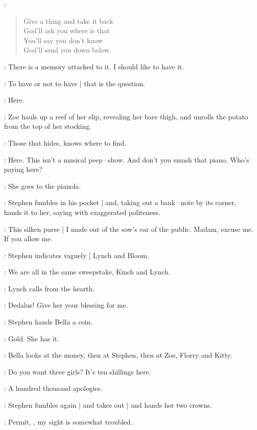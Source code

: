\Zoe:
\begin{verse}
    Give a thing and take it back\\
    God'll ask you where is that\\
    You'll say you don't know\\
    God'll send you down below.
\end{verse}

\Bloom:
There is a memory attached to it.
%
I should like to have it.

\Stephen[4a]:
To have or not to have |
that is the question.

\Zoe:
Here.

:
Zoe hauls up a reef of her slip,
revealing her bare thigh,
and unrolls the potato from the top of her stocking.

\Zoe:
Those that hides,
knows where to find.

\Bella:
Here.
This isn't a musical peep·show.
And don't you smash that piano.
Who's paying here?

:
She goes to the pianola.

:
Stephen fumbles in his pocket |
and,
taking out a bank·note by its corner,
hands it to her,
saying with exaggerated politeness.

\Stephen:
This silken purse |
I made out of the sow's ear of the public.
Madam,
excuse me.
If you allow me.

:
Stephen indicates vaguely |
Lynch and Bloom.

\Stephen:
We are all in the same sweepstake,
Kinch and Lynch.

:
Lynch calls from the hearth.

\Lynch:
Dedalus!
Give her your blessing for me.

:
Stephen hands Bella a coin.

\Stephen:
Gold.
She has it.

:
Bella looks at the money,
then at Stephen,
then at Zoe,
Florry and Kitty.

\Bella:
Do you want three girls?
It's ten shillings here.

\Stephen:
A hundred thousand apologies.

:
Stephen fumbles again |
and takes out |
and hands her two crowns.

\Stephen:
Permit,
,
my sight is somewhat troubled.

